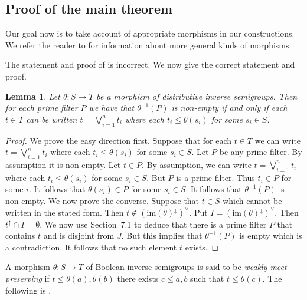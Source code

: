 \documentclass[a4paper]{amsart}
\newtheorem{lemma}[theorem]{Lemma}
\begin{document}
\subsection{Proof of the main theorem}

Our goal now is to take account of appropriate morphisms in our constructions.
We refer the reader to \cite{KL} for information about more general kinds of morphisms.

The statement and proof of \cite[part (3), Lemma 3.11]{LL} is incorrect.
We now give the correct statement and proof.

\begin{lemma}\label{lem:weakly-meet} Let $\theta \colon S \rightarrow T$ be a morphism of distributive inverse semigroups.
Then for each prime filter $P$ we have that $\theta^{-1}(P)$ is non-empty if and only if each $t \in T$
can be written $t = \bigvee_{i=1}^{n} t_{i}$ where each $t_{i} \leq \theta (s_{i})$ for some $s_{i} \in S$.
\end{lemma}
\begin{proof} We prove the easy direction first.
Suppose that for each $t \in T$ we can write $t = \bigvee_{i=1}^{n} t_{i}$ where each $t_{i} \leq \theta (s_{i})$ for some $s_{i} \in S$.
Let $P$ be any prime filter.
By assumption it is non-empty.
Let $t \in P$.
By assumption, we can write $t = \bigvee_{i=1}^{n} t_{i}$ where each $t_{i} \leq \theta (s_{i})$ for some $s_{i} \in S$.
But $P$ is a prime filter.
Thus $t_{i} \in P$ for some $i$.
It follows that $\theta (s_{i}) \in P$ for some $s_{i} \in S$.
It follows that  $\theta^{-1}(P)$ is non-empty. 
We now prove the converse.
Suppose that $t \in S$ which cannot be written in the stated form.
Then $t \notin \left( \mbox{im}(\theta)^{\downarrow} \right)^{\vee}$.
Put $I = \left( \mbox{im}(\theta)^{\downarrow} \right)^{\vee}$.
Then $t^{\uparrow} \cap I = \emptyset$.
We now use Section~7.1 to deduce that there is a prime filter $P$ that contains $t$ 
and is disjoint from $J$.
But this implies that $\theta^{-1}(P)$ is empty which is a contradiction.
It follows that no such element $t$ exists.
\end{proof}

A morphism $\theta \colon S \rightarrow T$ of Boolean inverse semigroups is said to be 
{\em weakly-meet-preserving} if $t \leq \theta (a), \theta (b)$
there exists $c \leq a,b$ such that $t \leq \theta (c)$.
The following is \cite[Proposition 3-4.6]{W}.
\end{document}
